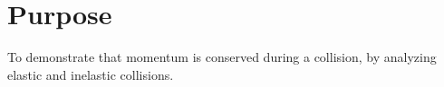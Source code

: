 
\section{Purpose}
\vspace{-0.5cm}
\singlespacing
To demonstrate that momentum is conserved during a collision, by analyzing elastic and inelastic collisions.
